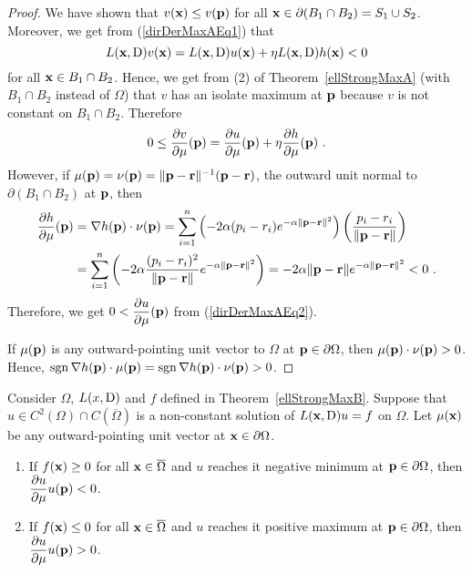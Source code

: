 \begin{proof}
We have shown that $v(\mathbf{x}) \leq v(\mathbf{p})$ 
for all $\mathbf{x} \in \partial (B_1 \cap B_2) = S_1 \cup S_2$.
Moreover, we get from (\ref{dirDerMaxAEq1}) that
\[
  L(\mathbf{x},\operatorname{D}) v (\mathbf{x}) = L(\mathbf{x},\operatorname{D}) u(\mathbf{x})
  + \eta L(\mathbf{x},\operatorname{D}) h(\mathbf{x}) < 0
\]
for all $\mathbf{x} \in B_1 \cap B_2$.  Hence, we get
from (2) of Theorem~\ref{ellStrongMaxA} (with $B_1 \cap B_2$ instead
of $\Omega$) that $v$ has an isolate maximum at $\mathbf{p}$ because $v$
is not constant on $B_1 \cap B_2$.  Therefore
\begin{equation} \label{dirDerMaxAEq2}
0 \leq \frac{\partial{v}}{\partial \mu}(\mathbf{p}) 
= \frac{\partial{u}}{\partial \mu}(\mathbf{p}) + \eta \frac{\partial{h}}{\partial \mu}(\mathbf{p}) \ .
\end{equation}
However, if
$\mu(\mathbf{p}) = \nu(\mathbf{p}) = \|\mathbf{p}-\mathbf{r}\|^{-1} (\mathbf{p} - \mathbf{r})$,
the outward unit normal to $\partial (B_1 \cap B_2)$ at $\mathbf{p}$, then
\begin{align*}
\frac{\partial{h}}{\partial \mu}(\mathbf{p}) &= \nabla h(\mathbf{p}) \cdot \nu(\mathbf{p})
= \sum_{i=1}^n \left( -2 \alpha (p_i-r_i) e^{-\alpha\|\mathbf{p}-\mathbf{r}\|^2} \right)
\left( \frac{p_i- r_i}{\|\mathbf{p} - \mathbf{r}\|} \right) \\
&= \sum_{i=1}^n \left( -2 \alpha \frac{(p_i-r_i)^2}{\|\mathbf{p} - \mathbf{r}\|}
e^{-\alpha\|\mathbf{p}-\mathbf{r}\|^2} \right)
= -2 \alpha \|\mathbf{p}-\mathbf{r}\| e^{-\alpha\|\mathbf{p}-\mathbf{r}\|^2}
 < 0 \ .
\end{align*}
Therefore, we get $\displaystyle 0 < \frac{\partial{u}}{\partial \mu}(\mathbf{p})$ from
(\ref{dirDerMaxAEq2}).

If $\mu(\mathbf{p})$ is any outward-pointing unit vector to $\Omega$ at
$\mathbf{p} \in \partial \Omega$, then $\mu(\mathbf{p}) \cdot \nu(\mathbf{p}) > 0$.
Hence, $\operatorname{sgn} \nabla h(\mathbf{p}) \cdot \mu(\mathbf{p})
= \operatorname{sgn} \nabla h(\mathbf{p}) \cdot \nu(\mathbf{p}) > 0$.
\end{proof}


\begin{theorem}
Consider $\Omega$, $L(x,\operatorname{D})$ and $f$ defined in Theorem~\ref{ellStrongMaxB}.
Suppose that $\displaystyle u \in C^2(\Omega) \cap C(\overline{\Omega})$ is a
non-constant solution of $L(\mathbf{x},\operatorname{D}) u = f$ on $\Omega$.
Let $\mu(\mathbf{x})$ be any outward-pointing unit vector at
$\mathbf{x} \in \partial \Omega$. 
\begin{enumerate}
\item If $f(\mathbf{x}) \geq 0$ for all $\mathbf{x} \in \overline{\Omega}$
and $u$ reaches it negative minimum at $\mathbf{p} \in \partial \Omega$,
then $\displaystyle \frac{\partial{u}}{\partial \mu} u(\mathbf{p}) < 0$.
\item If $f(\mathbf{x}) \leq 0$ for all $\mathbf{x} \in \overline{\Omega}$
and $u$ reaches it positive maximum at $\mathbf{p} \in \partial \Omega$,
then $\displaystyle \frac{\partial{u}}{\partial \mu} u(\mathbf{p}) > 0$.
\end{enumerate}
\end{theorem}

